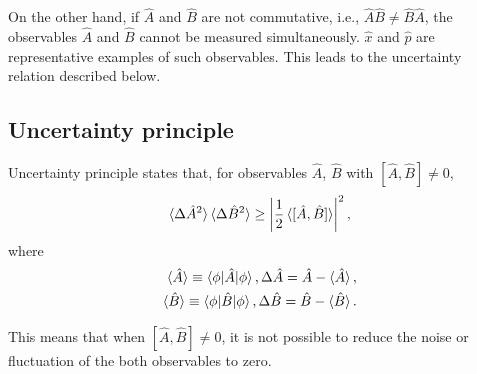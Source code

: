 On the other hand, if $\hat A$ and $\hat B$ are not commutative, i.e., $\hat A \hat B \neq \hat B \hat A$, the observables $\hat A$ and $\hat B$ cannot be measured simultaneously. $\hat x$ and $\hat p$ are representative examples of such observables. This leads to the uncertainty relation described below.

\subsection{Uncertainty principle}
Uncertainty principle states that, for observables $\hat A$, $\hat B$ with $[\hat A, \hat B] \neq 0$,
\begin{equation}
  \braket {\Delta \hat A^2}\braket{\Delta \hat B^2} \geq \left| \frac{1}{2} \braket {[\hat A, \hat B]}\right|^2,
  \label{eq:uncertainty}
\end{equation}
where
\begin{equation}
\begin{aligned}
  \braket{\hat A} \equiv \braket{\phi|\hat A|\phi}, \Delta \hat A = \hat A - \braket {\hat A},\\
  \braket{\hat B} \equiv \braket{\phi|\hat B|\phi}, \Delta \hat B = \hat B - \braket {\hat B}.
\end{aligned}
\end{equation}

This means that when $[\hat A, \hat B] \neq 0$, it is not possible to reduce the noise or fluctuation of the both observables to zero. 

